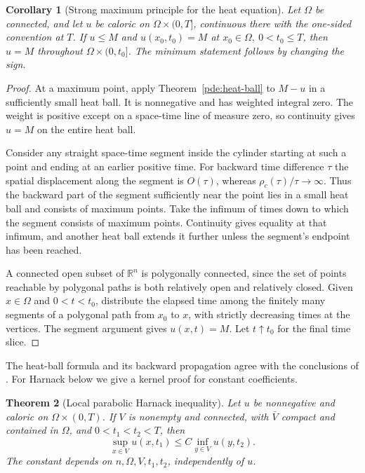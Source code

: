 \documentclass[11pt,oneside,openany]{book}
\theoremstyle{plain}
\newtheorem{theorem}{Theorem}[chapter]
\newtheorem{corollary}[theorem]{Corollary}
\theoremstyle{definition}
\theoremstyle{remark}
\begin{document}
\begin{corollary}[Strong maximum principle for the heat equation]
\label{pde:heat-strong-maximum}
Let \(\Omega\) be connected, and let \(u\) be caloric on
\(\Omega\times(0,T]\), continuous there with the one-sided
convention at \(T\). If \(u\leq M\) and
\(u(x_0,t_0)=M\) at \(x_0\in\Omega,\ 0<t_0\leq T\),
then \(u=M\) throughout \(\Omega\times(0,t_0]\).
The minimum statement follows by changing the sign.
\end{corollary}

\begin{proof}
At a maximum point, apply Theorem~\ref{pde:heat-ball} to \(M-u\)
in a sufficiently small heat ball. It is nonnegative and has
weighted integral zero. The weight is positive except on a
space-time line of measure zero, so continuity gives \(u=M\)
on the entire heat ball.

Consider any straight space-time segment inside the cylinder
starting at such a point and ending at an earlier positive time.
For backward time difference \(\tau\) the spatial displacement
along the segment is \(O(\tau)\), whereas
\(\rho_c(\tau)/\tau\to\infty\). Thus the backward part of the
segment sufficiently near the point lies in a small heat ball
and consists of maximum points. Take the infimum of times down
to which the segment consists of maximum points. Continuity
gives equality at that infimum, and another heat ball extends
it further unless the segment's endpoint has been reached.

A connected open subset of \(\mathbb R^n\) is polygonally
connected, since the set of points reachable by polygonal
paths is both relatively open and relatively closed.
Given \(x\in\Omega\) and \(0<t<t_0\), distribute the elapsed
time among the finitely many segments of a polygonal path from
\(x_0\) to \(x\), with strictly decreasing times at the vertices.
The segment argument gives \(u(x,t)=M\). Let \(t\uparrow t_0\)
for the final time slice.
\end{proof}

The heat-ball formula and its backward propagation agree with
the conclusions of \cite[\S\S 2.3.2--2.3.3]{Evans}.
For Harnack below we give a kernel proof for constant coefficients.

\begin{theorem}[Local parabolic Harnack inequality]
\label{pde:heat-harnack}
Let \(u\) be nonnegative and caloric on \(\Omega\times(0,T)\).
If \(V\) is nonempty and connected, with
\(\bar V\) compact and contained in \(\Omega\), and
\(0<t_1<t_2<T\), then
\[
 \sup_{x\in V}u(x,t_1)\leq C\inf_{y\in V}u(y,t_2).
\]
The constant depends on \(n,\Omega,V,t_1,t_2\), independently of \(u\).
\end{theorem}
\end{document}
